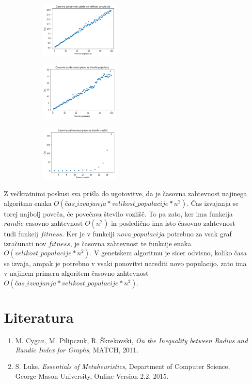 \documentclass[a4paper, 10pt]{article}
\begin{document}
\begin{figure}[H]
\begin{subfigure}{38mm}
\centering
\includegraphics[width=4cm]{velikost_populacije}
\end{subfigure}
\begin{subfigure}{38mm}
\centering
\includegraphics[width=4cm]{stevilo_populacij}
\end{subfigure}
\begin{subfigure}{38mm}
\centering
\includegraphics[width=4cm]{velikost_grafov}
\end{subfigure}
\end{figure}

Z večkratnimi poskusi sva prišla do ugotovitve, da je časovna zahtevnost najinega algoritma enaka $O(čas\_izvajanja * velikost\_populacije * n^2)$.  Čas izvajanja se torej najbolj poveča, če povečava število vozlišč. To pa zato, ker ima funkcija $randic$ casovno zahtevnost $O(n^2)$ in posledično ima isto časovno zahtevnost tudi funkcij $fitness$.  Ker je v funkciji $nova\_populacija$ potrebno za vsak graf izračunati nov $fitness$, je časovna zahtevnost te funkcije enaka $O(velikost\_populacije * n^2)$. V genetskem algoritmu je sicer odvisno, koliko časa se izvaja, ampak  je potrebno v vsaki ponovitvi narediti novo populacijo, zato ima v najinem primeru algoritem časovno zahtevnost $O(čas\_izvajanja * velikost\_populacije * n^2)$.

\pagebreak

\section{Literatura}
\vspace{0.5cm}

\renewcommand{\labelenumi}{[\arabic{enumi}]}
\begin{enumerate}
\item \noindent M. Cygan, M. Pilipczuk, R. Škrekovski, \textsl{On the Inequality between Radius and Randic Index for Graphs}, MATCH, 2011. 
\vspace{0.5cm}
\item \noindent  S. Luke, \textsl{Essentials of Metaheuristics}, Department of Computer Science, George Mason University, Online Version 2.2, 2015.
\end{enumerate}
\end{document}
